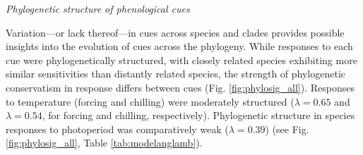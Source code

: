 \documentclass[11pt]{article}
\begin{document}
\emph{Phylogenetic structure of phenological cues}

Variation---or lack thereof---in cues across species and clades provides possible insights into the evolution of cues across the phylogeny. While responses to each cue were phylogenetically structured, with closely related species exhibiting more similar sensitivities than distantly related species, the strength of phylogenetic conservatism in response differs between cues (Fig. \ref{fig:phylosig_all}). Responses to temperature (forcing and chilling) were moderately structured ($\lambda = 0.65$ and $\lambda = 0.54$, for forcing and chilling, respectively). Phylogenetic structure in species responses to photoperiod was comparatively weak ($\lambda= 0.39$) (see Fig. \ref{fig:phylosig_all}, Table \ref{tab:modelanglamb}). %
\end{document}
